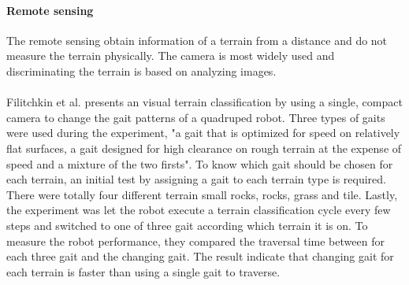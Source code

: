 \documentclass[USenglish]{ifimaster}  %
\begin{document}
\paragraph{Remote sensing}
The remote sensing obtain information of a terrain from a distance and do not measure the terrain physically. The camera is most widely used and discriminating the terrain is based on analyzing images.
\\
\\ 
Filitchkin et al. \cite{littleDog} presents an visual terrain classification by using a single, compact camera to change the gait patterns of a quadruped robot. Three types of gaits were used during the experiment, "a gait that is optimized for speed on relatively flat surfaces, a gait designed for high clearance on rough terrain at the expense of speed and a mixture of the two firsts". To know which gait should be chosen for each terrain, an initial test by assigning a gait to each terrain type is required. There were totally four different terrain small rocks, rocks, grass and tile. Lastly, the experiment was let the robot execute a terrain classification cycle every few steps and switched to one of three gait according which terrain it is on. To measure the robot performance, they compared the traversal time between for each three gait and the changing gait. The result indicate that changing gait for each terrain is faster than using a single gait to traverse.
\\
\\

\end{document}
